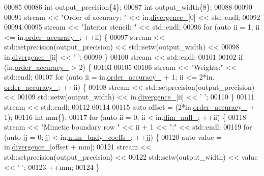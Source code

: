 \begin{DoxyCode}
00085 
00086   \textcolor{keywordtype}{int} output\_precision\{4\};
00087   \textcolor{keywordtype}{int} output\_width\{8\};
00088 
00090 
00091   stream << \textcolor{stringliteral}{"Order of accuracy: "} << in.\hyperlink{classmtk_1_1Div1D_a0f96410051ba1fa6d91dfa7b7eacead9}{divergence\_}[0] << std::endl;
00092 
00094 
00095   stream << \textcolor{stringliteral}{"Interior stencil: "} << std::endl;
00096   \textcolor{keywordflow}{for} (\textcolor{keyword}{auto} ii = 1; ii <= in.\hyperlink{classmtk_1_1Div1D_a9c8a8d7cd08a72dbd1daa8deee06f9c6}{order\_accuracy\_}; ++ii) \{
00097     stream << std::setprecision(output\_precision) << std::setw(output\_width) <<
00098       in.\hyperlink{classmtk_1_1Div1D_a0f96410051ba1fa6d91dfa7b7eacead9}{divergence\_}[ii] << \textcolor{charliteral}{' '};
00099   \}
00100   stream << std::endl;
00101 
00102   \textcolor{keywordflow}{if} (in.\hyperlink{classmtk_1_1Div1D_a9c8a8d7cd08a72dbd1daa8deee06f9c6}{order\_accuracy\_} > 2) \{
00103 
00105 
00106     stream << \textcolor{stringliteral}{"Weights:"} << std::endl;
00107     \textcolor{keywordflow}{for} (\textcolor{keyword}{auto} ii = in.\hyperlink{classmtk_1_1Div1D_a9c8a8d7cd08a72dbd1daa8deee06f9c6}{order\_accuracy\_} + 1; ii <= 2*in.
      \hyperlink{classmtk_1_1Div1D_a9c8a8d7cd08a72dbd1daa8deee06f9c6}{order\_accuracy\_}; ++ii) \{
00108       stream << std::setprecision(output\_precision) <<
00109         std::setw(output\_width) << in.\hyperlink{classmtk_1_1Div1D_a0f96410051ba1fa6d91dfa7b7eacead9}{divergence\_}[ii] << \textcolor{charliteral}{' '};
00110     \}
00111     stream << std::endl;
00112 
00114 
00115     \textcolor{keyword}{auto} offset = (2*in.\hyperlink{classmtk_1_1Div1D_a9c8a8d7cd08a72dbd1daa8deee06f9c6}{order\_accuracy\_} + 1);
00116     \textcolor{keywordtype}{int} mm\{\};
00117     \textcolor{keywordflow}{for} (\textcolor{keyword}{auto} ii = 0; ii < in.\hyperlink{classmtk_1_1Div1D_a264027144def76d802778391f55381a0}{dim\_null\_}; ++ii) \{
00118       stream << \textcolor{stringliteral}{"Mimetic boundary row "} << ii + 1 << \textcolor{stringliteral}{":"} << std::endl;
00119       \textcolor{keywordflow}{for} (\textcolor{keyword}{auto} jj = 0; jj < in.\hyperlink{classmtk_1_1Div1D_a717240b41eaa2adde858630b9e3d3042}{num\_bndy\_coeffs\_}; ++jj) \{
00120         \textcolor{keyword}{auto} value = in.\hyperlink{classmtk_1_1Div1D_a0f96410051ba1fa6d91dfa7b7eacead9}{divergence\_}[offset + mm];
00121         stream << std::setprecision(output\_precision) <<
00122           std::setw(output\_width) << value << \textcolor{charliteral}{' '};
00123         ++mm;
00124       \}

\end{DoxyCode}
